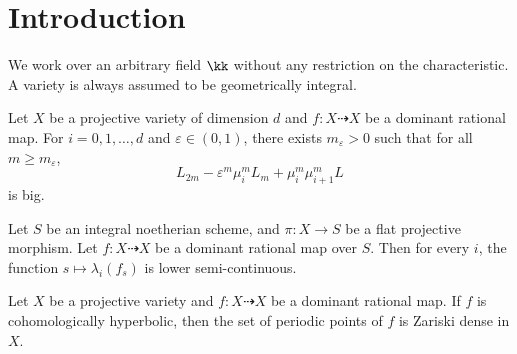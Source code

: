 \section{Introduction}








  We work over an arbitrary field $\kk$ without any restriction on the characteristic.
  A variety is always assumed to be geometrically integral.

  \begin{mainthm}[{= \cref{thm:big_inequality_by_mu_i}, ref. \cite[Theorem 3.7]{Xie24recursive_inequalities}}]\label{mainthm:recursive_inequality}
    Let $X$ be a projective variety of dimension $d$ and $f: X \dashrightarrow X$ be a dominant rational map.
    For $i = 0, 1, \ldots, d$ and $\varepsilon \in (0, 1)$, there exists $m_\varepsilon > 0$ such that for all $m \geq m_\varepsilon$,
    \[  L_{2m} - \varepsilon^m \mu_i^m L_m + \mu_i^m \mu_{i+1}^m L \]
    is big.
  \end{mainthm}

  \begin{mainthm}[{= \cref{thm:semi-continuity-of-dynamical-degrees}, ref. \cite[Theorem 1.8]{Xie24recursive_inequalities}}]\label{mainthm:semi-continuity}
    Let $S$ be an integral noetherian scheme, and $\pi: X \to S$ be a flat projective morphism. 
    Let $f: X \dashrightarrow X$ be a dominant rational map over $S$.
    Then for every $i$, the function $s \mapsto \lambda_i(f_s)$ is lower semi-continuous.
  \end{mainthm}

  \begin{mainthm}[{= \cref{thm:density_of_periodic_points_for_cohomologically_hyperbolic_maps}, ref. \cite[Theorem 1.12]{Xie24recursive_inequalities}}]\label{mainthm:periodic_points}
    Let $X$ be a projective variety and $f: X \dashrightarrow X$ be a dominant rational map.
    If $f$ is cohomologically hyperbolic, then the set of periodic points of $f$ is Zariski dense in $X$.
  \end{mainthm}

